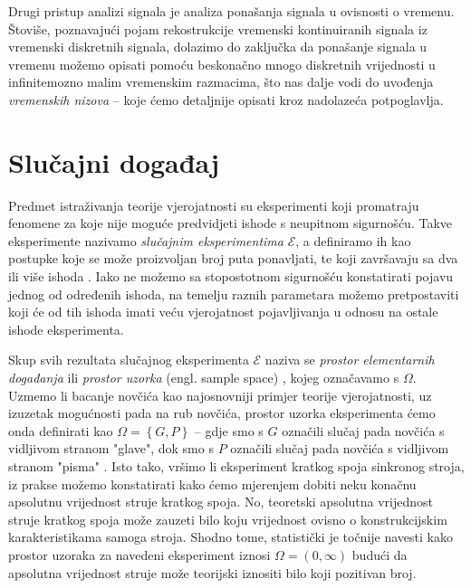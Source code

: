 \documentclass[a4paper,12pt,oneside]{memoir}
\begin{document}
        
        Drugi pristup analizi signala je analiza ponašanja signala u ovisnosti o vremenu. Štoviše, poznavajući pojam rekostrukcije vremenski kontinuiranih signala iz vremenski diskretnih signala, dolazimo do zaključka da ponašanje signala u vremenu možemo opisati pomoću beskonačno mnogo diskretnih vrijednosti u infinitemozno malim vremenskim razmacima, što nas dalje vodi do uvođenja \textit{vremenskih nizova} -- koje ćemo detaljnije opisati kroz nadolazeća potpoglavlja.



        \section{Slučajni događaj}
            
            Predmet istraživanja teorije vjerojatnosti su eksperimenti koji promatraju fenomene za koje nije moguće predvidjeti ishode s neupitnom sigurnošću. Takve eksperimente nazivamo \textit{slučajnim eksperimentima} $\mathscr{E}$, a definiramo ih kao postupke koje se može proizvoljan broj puta ponavljati, te koji završavaju sa dva ili više ishoda \cite{Bahovec}. Iako ne možemo sa stopostotnom sigurnošću konstatirati pojavu jednog od određenih ishoda, na temelju raznih parametara možemo pretpostaviti koji će od tih ishoda imati veću vjerojatnost pojavljivanja u odnosu na ostale ishode eksperimenta.

            Skup svih rezultata slučajnog eksperimenta $\mathscr{E}$ naziva se \textit{prostor elementarnih događanja} ili \textit{prostor uzorka} (engl. sample space) \cite{Bahovec}, kojeg označavamo s $\Omega$. Uzmemo li bacanje novčića kao najosnovniji primjer teorije vjerojatnosti, uz izuzetak mogućnosti pada na rub novčića, prostor uzorka eksperimenta ćemo onda definirati kao $\Omega=\left\{G,P\right\}$ -- gdje smo s $G$ označili slučaj pada novčića s vidljivom stranom "glave", dok smo s $P$ označili slučaj pada novčića s vidljivom stranom "pisma" \cite{Dekking}. Isto tako, vršimo li eksperiment kratkog spoja sinkronog stroja, iz prakse možemo konstatirati kako ćemo mjerenjem dobiti neku konačnu apsolutnu vrijednost struje kratkog spoja. No, teoretski apsolutna vrijednost struje kratkog spoja može zauzeti bilo koju vrijednost ovisno o konstrukcijskim karakteristikama samoga stroja. Shodno tome, statistički je točnije navesti kako prostor uzoraka za navedeni eksperiment iznosi $\Omega=(0,\infty)$ budući da apsolutna vrijednost struje može teorijski iznositi bilo koji pozitivan broj.
\end{document}
